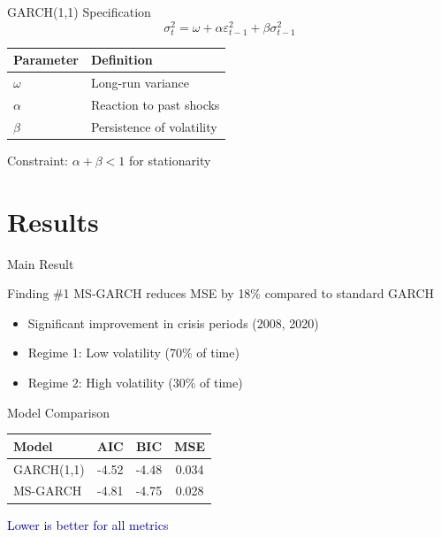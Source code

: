 \documentclass[aspectratio=169]{beamer}
\begin{document}
\begin{frame}{GARCH(1,1) Specification}
\begin{equation}
\sigma_t^2 = \omega + \alpha \varepsilon_{t-1}^2 + \beta \sigma_{t-1}^2
\end{equation}
\vspace{3mm}
\begin{center}
\begin{tabular}{ll}
\toprule
\textbf{Parameter} & \textbf{Definition} \\
\midrule
$\omega$ & Long-run variance \\
$\alpha$ & Reaction to past shocks \\
$\beta$ & Persistence of volatility \\
\bottomrule
\end{tabular}
\end{center}
\vspace{2mm}
\textcolor{accent}{Constraint:} $\alpha + \beta < 1$ for stationarity
\end{frame}

\section{Results}

\begin{frame}{Main Result}
\begin{block}{Finding \#1}
MS-GARCH reduces MSE by \textcolor{accent}{18\%} compared to standard GARCH
\end{block}
\vspace{3mm}
\begin{itemize}
    \item Significant improvement in crisis periods (2008, 2020)
    \item \textcolor{accent}{Regime 1:} Low volatility (70\% of time)
    \item \textcolor{accent}{Regime 2:} High volatility (30\% of time)
\end{itemize}
\end{frame}

\begin{frame}{Model Comparison}
\centering
\begin{tabular}{l c c c}
\toprule
\textbf{Model} & \textbf{AIC} & \textbf{BIC} & \textbf{MSE} \\
\midrule
GARCH(1,1) & -4.52 & -4.48 & 0.034 \\
MS-GARCH & \textcolor{accent}{-4.81} & \textcolor{accent}{-4.75} & \textcolor{accent}{0.028} \\
\bottomrule
\end{tabular}
\vspace{3mm}
\par \small \textcolor{navy}{Lower is better for all metrics}
\end{frame}
\end{document}
